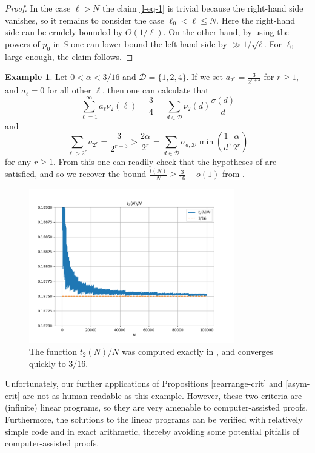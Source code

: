\documentclass[12pt,a4paper,reqno]{amsart}
\numberwithin{equation}{section}
\theoremstyle{plain}
\theoremstyle{definition}
\newtheorem{example}[theorem]{Example}
\begin{document}
\begin{proof}
In the case $\ell>N$ the claim \eqref{l-eq-1} is trivial because the right-hand side vanishes, so it remains to consider the case $\ell_0 < \ell \leq N$. Here the right-hand side can be crudely bounded by $O(1/\ell)$.  On the other hand, by using the powers of $p_0$ in $S$ one can lower bound the left-hand side by $\gg 1/\sqrt{\ell}$.  For $\ell_0$ large enough, the claim follows.
\end{proof}

\begin{example}  Let $0 < \alpha < 3/16$ and ${\mathcal D} = \{1,2,4\}$.  If we set $a_{2^r} = \frac{3}{2^{r+3}}$ for $r \geq 1$, and $a_\ell=0$ for all other $\ell$, then one can calculate that
$$ \sum_{\ell=1}^\infty a_\ell \nu_2(\ell) = \frac{3}{4} = \sum_{d \in {\mathcal D}} \nu_2(d) \frac{\sigma(d)}{d}$$
and
$$ \sum_{\ell > 2^r} a_{2^r} = \frac{3}{2^{r+3}} > \frac{2\alpha}{2^r} = \sum_{d \in {\mathcal D}} \sigma_{d,{\mathcal D}} \min\left( \frac{1}{d}, \frac{\alpha}{2^r} \right)$$
for any $r \geq 1$.  From this one can readily check that the hypotheses of  are satisfied, and so we recover the bound $\frac{t(N)}{N} \geq \frac{3}{16}-o(1)$ from \cite{guy-selfridge}.
\end{example}

\begin{figure}
  \centering
  \includegraphics[width=0.8\textwidth]{t2.png}
  \vspace{-8pt}
  \caption{The function $t_2(N)/N$ was computed exactly in \cite{guy-selfridge}, and converges quickly to $3/16$.}\label{fig-t2}
\end{figure}

Unfortunately, our further applications of Propositions \ref{rearrange-crit} and \ref{asym-crit} are not as human-readable as this example.
However, these two criteria are (infinite) linear programs, so they are very amenable to computer-assisted proofs.
Furthermore, the solutions to the linear programs can be verified with relatively simple code and in exact arithmetic, thereby avoiding some potential pitfalls of computer-assisted proofs.
\end{document}
